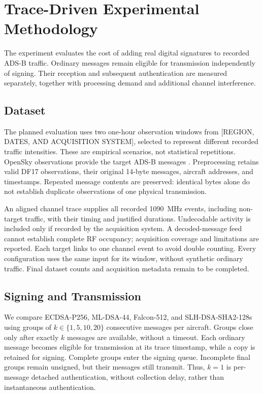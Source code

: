 \section{Trace-Driven Experimental Methodology}
\label{sec:methodology}

The experiment evaluates the cost of adding real digital signatures to
recorded ADS-B traffic. Ordinary messages remain eligible for transmission
independently of signing. Their reception and subsequent authentication are
measured separately, together with processing demand and additional
channel interference.

\subsection{Dataset}
\label{subsec:opensky-dataset}

The planned evaluation uses two one-hour observation windows from
[REGION, DATES, AND ACQUISITION SYSTEM], selected to represent different
recorded traffic intensities. These are empirical scenarios, not statistical
repetitions. OpenSky observations provide the target ADS-B messages
\cite{Schafer2014OpenSky,Strohmeier2014OpenSky}. Preprocessing retains valid
DF17 observations, their original 14-byte messages, aircraft addresses, and
timestamps. Repeated message contents are preserved: identical bytes alone
do not establish duplicate observations of one physical transmission.

An aligned channel trace supplies all recorded 1090~MHz events, including
non-target traffic, with their timing and justified durations. Undecodable
activity is included only if recorded by the acquisition system. A
decoded-message feed cannot establish complete RF occupancy; acquisition
coverage and limitations are reported. Each target links to one channel
event to avoid double counting. Every configuration uses the same input
for its window, without synthetic ordinary traffic. Final dataset counts
and acquisition metadata remain to be completed.

\subsection{Signing and Transmission}
\label{subsec:replay-simulator}

We compare ECDSA-P256, ML-DSA-44, Falcon-512, and SLH-DSA-SHA2-128s using
groups of $k\in\{1,5,10,20\}$ consecutive messages per aircraft. Groups close
only after exactly $k$ messages are available, without a timeout. Each
ordinary message becomes eligible for transmission at its trace timestamp,
while a copy is retained for signing. Complete groups enter the signing
queue. Incomplete final groups remain unsigned, but their messages still
transmit. Thus, $k=1$ is per-message detached authentication, without
collection delay, rather than instantaneous authentication.

